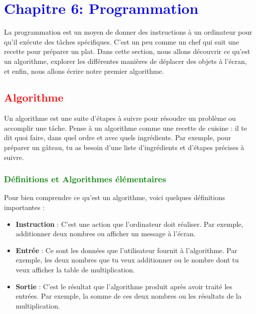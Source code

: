 \documentclass{article}
\begin{document}
\section{\textcolor{blue}{Chapitre 6: Programmation}}

La programmation est un moyen de donner des instructions à un ordinateur pour qu'il exécute des tâches spécifiques. C'est un peu comme un chef qui suit une recette pour préparer un plat. Dans cette section, nous allons découvrir ce qu'est un algorithme, explorer les différentes manières de déplacer des objets à l'écran, et enfin, nous allons écrire notre premier algorithme.

\subsection{\textcolor{red}{Algorithme}}

Un algorithme est une suite d'étapes à suivre pour résoudre un problème ou accomplir une tâche. Pense à un algorithme comme une recette de cuisine : il te dit quoi faire, dans quel ordre et avec quels ingrédients. Par exemple, pour préparer un gâteau, tu as besoin d'une liste d'ingrédients et d'étapes précises à suivre.

\subsubsection{\textcolor{green}{Définitions et Algorithmes élémentaires}}

Pour bien comprendre ce qu'est un algorithme, voici quelques définitions importantes :

\begin{tcolorbox}[colback=red!10!white, colframe=red!75!black, title=\textcolor{white}{Définitions}]
\begin{itemize}
    \item \textbf{Instruction} : C'est une action que l'ordinateur doit réaliser. Par exemple, additionner deux nombres ou afficher un message à l'écran.
    \item \textbf{Entrée} : Ce sont les données que l'utilisateur fournit à l'algorithme. Par exemple, les deux nombres que tu veux additionner ou le nombre dont tu veux afficher la table de multiplication.
    \item \textbf{Sortie} : C'est le résultat que l'algorithme produit après avoir traité les entrées. Par exemple, la somme de ces deux nombres ou les résultats de la multiplication.
\end{itemize}
\end{tcolorbox}
\end{document}
